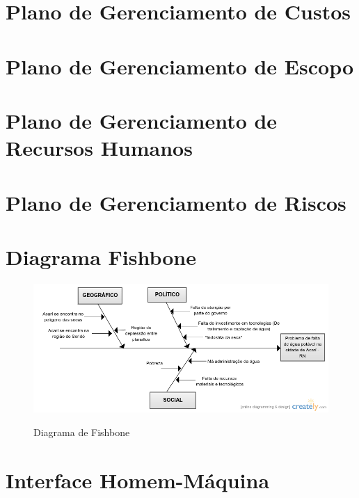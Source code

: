 \begin{anexosenv}
  

\chapter{Plano de Gerenciamento de Custos}

  

\chapter{Plano de Gerenciamento de Escopo}

 

\chapter{Plano de Gerenciamento de Recursos Humanos}

  
  
\chapter{Plano de Gerenciamento de Riscos}

  

\chapter{Diagrama Fishbone}
  
  \begin{figure}[!h]
    \centering
    \includegraphics[scale = 0.7, angle = 90]{editaveis/figuras/fishbone}
    \label{fishbone}
    \caption{Diagrama de Fishbone}
   \end{figure}
   \FloatBarrier
  
 \chapter{Interface Homem-Máquina}
 	
\end{anexosenv}

